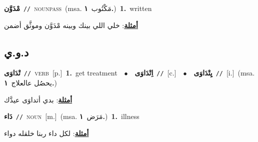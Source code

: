 \documentclass[10pt,a4paper,twoside]{article} %
\begin{document}
\begin{multicols}{2}
{\setlength\topsep{0pt}\textbf{\foreignlanguage{arabic}{مْدَوَّن}}\ {\color{gray}\texttt{//}\color{black}}\ \textsc{noun\textunderscore pass}\ \color{gray}(msa. \foreignlanguage{arabic}{مَكْتُوب}~\foreignlanguage{arabic}{\textbf{١.}})\color{black}\ \textbf{1.}~written\  \begin{flushright}\color{gray}\foreignlanguage{arabic}{\textbf{\underline{\foreignlanguage{arabic}{أمثلة}}}: خلي اللي بينك وبينه مْدَوَّن وموثَّق أضمن}\end{flushright}\color{black}} \vspace{2mm}

\vspace{-3mm}
\subsection*{\color{blue}\foreignlanguage{arabic}{د.و.ي}\color{blue}{}} 

{\setlength\topsep{0pt}\textbf{\foreignlanguage{arabic}{تْدَاوَى}}\ {\color{gray}\texttt{//}\color{black}}\ \textsc{verb}\ [p.]\ \textbf{1.}~get treatment\ \ $\bullet$\ \ \setlength\topsep{0pt}\textbf{\foreignlanguage{arabic}{اِتْدَاوَى}}\ {\color{gray}\texttt{//}\color{black}}\ [c.]\ \ $\bullet$\ \ \setlength\topsep{0pt}\textbf{\foreignlanguage{arabic}{يِتْدَاوَى}}\ {\color{gray}\texttt{//}\color{black}}\ [i.]\ \color{gray}(msa. \foreignlanguage{arabic}{يحصُل عالعلاج}~\foreignlanguage{arabic}{\textbf{١.}})\color{black}\  \begin{flushright}\color{gray}\foreignlanguage{arabic}{\textbf{\underline{\foreignlanguage{arabic}{أمثلة}}}: بدي أتداوَى عيدَّك}\end{flushright}\color{black}} \vspace{2mm}

{\setlength\topsep{0pt}\textbf{\foreignlanguage{arabic}{دَاء}}\ {\color{gray}\texttt{//}\color{black}}\ \textsc{noun}\ [m.]\ \color{gray}(msa. \foreignlanguage{arabic}{مَرَض}~\foreignlanguage{arabic}{\textbf{١.}})\color{black}\ \textbf{1.}~illness\  \begin{flushright}\color{gray}\foreignlanguage{arabic}{\textbf{\underline{\foreignlanguage{arabic}{أمثلة}}}: لكل داء ربنا خلقله دواء}\end{flushright}\color{black}} \vspace{2mm}


\end{multicols}
\end{document}
